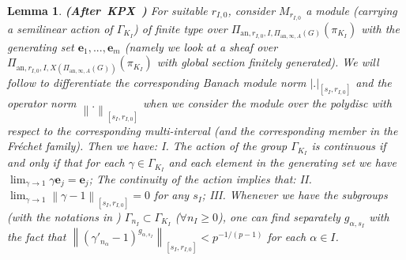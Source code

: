 \documentclass[12pt]{amsart}
\newtheorem{lemma}[theorem]{Lemma}
\theoremstyle{definition}
\numberwithin{equation}{section}
\begin{document}
\begin{lemma} \mbox{\bf{(After KPX \cite[Proposition 2.2.14]{KPX})}}
For suitable $r_{I,0}$, consider $M_{r_{I,0}}$ a module (carrying a semilinear action of $\Gamma_{K_I}$) of finite type over $\Pi_{\mathrm{an},r_{I,0},I,\Pi_{\mathrm{an},\infty,A}(G)}(\pi_{K_I})$ with the generating set $\mathbf{e}_1,...,\mathbf{e}_m$ (namely we look at a sheaf over $\Pi_{\mathrm{an},r_{I,0},I,X(\Pi_{\mathrm{an},\infty,A}(G))}(\pi_{K_I})$ with global section finitely generated). We will follow \cite[Proposition 2.2.14]{KPX} to differentiate the corresponding Banach module norm $|.|_{[s_I,r_{I,0}]}$ and the operator norm	$\left\|.\right\|_{[s_I,r_{I,0}]}$ when we consider the module over the polydisc with respect to the corresponding multi-interval (and the corresponding member in the Fr\'echet family). Then we have: I. The action of the group $\Gamma_{K_I}$ is continuous if and only if that for each $\gamma\in \Gamma_{K_I}$ and each element in the generating set we have $\lim_{\gamma\rightarrow 1} \gamma \mathbf{e}_j=\mathbf{e}_j$; The continuity of the action implies that: 
II. $\lim_{\gamma\rightarrow 1}\left\|\gamma-1\right\|_{[s_I,r_{I,0}]}=0$ for any $s_I$; 
III. Whenever we have the subgroups (with the notations in \cite[Proposition 2.2.14]{KPX}) $\Gamma_{n_I}\subset \Gamma_{K_I}$ ($\forall n_I\geq 0$), one can find separately $g_{\alpha,s_I}$ with the fact that $\left\|(\gamma'_{n_\alpha}-1)^{g_{\alpha,s_I}}\right\|_{[s_I,r_{I,0}]}< p^{-1/(p-1)}$ for each $\alpha\in I$.
\end{lemma}
\end{document}
